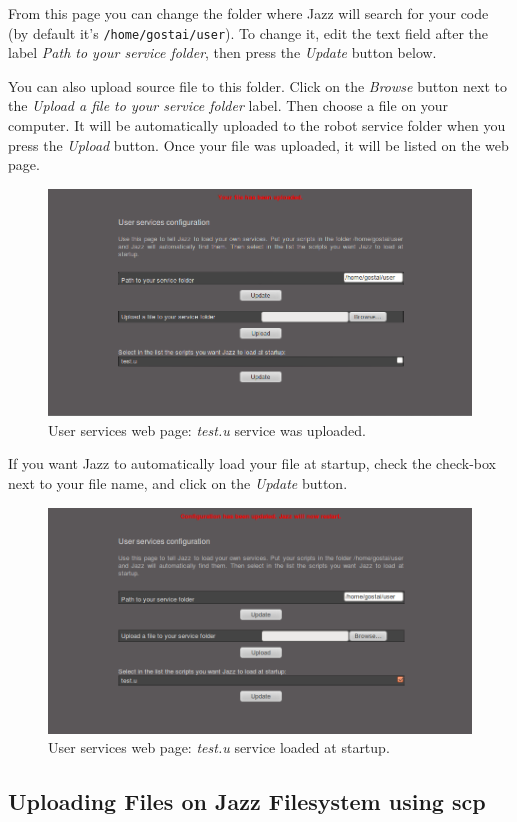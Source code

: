 From this page you can change the folder where Jazz will search for your code (by default it's \lstinline{/home/gostai/user}).
To change it, edit the text field after the label \textit{Path to your service folder}, then press the \textit{Update} button below.

You can also upload \us source file to this folder. Click on the \textit{Browse} button next to the \textit{Upload a file to your service folder} label. Then choose a file on your computer. It will be automatically uploaded to the robot service folder when you press the \textit{Upload} button.
Once your file was uploaded, it will be listed on the web page.

\begin{figure}[!h]
  \centering
  \includegraphics[width=.7\linewidth]{img/jazz/userservices2}
  \caption{User services web page: \textit{test.u} service was uploaded.}
  \label{fig:jazz:userservice2}
\end{figure}

If you want Jazz to automatically load your \us file at startup, check the check-box next to your file name, and click on the \textit{Update} button.

\begin{figure}[!h]
  \centering
  \includegraphics[width=.7\linewidth]{img/jazz/userservices3}
  \caption{User services web page: \textit{test.u} service loaded at startup.}
  \label{fig:jazz:userservice3}
\end{figure}

\subsection{Uploading Files on Jazz Filesystem using scp}

